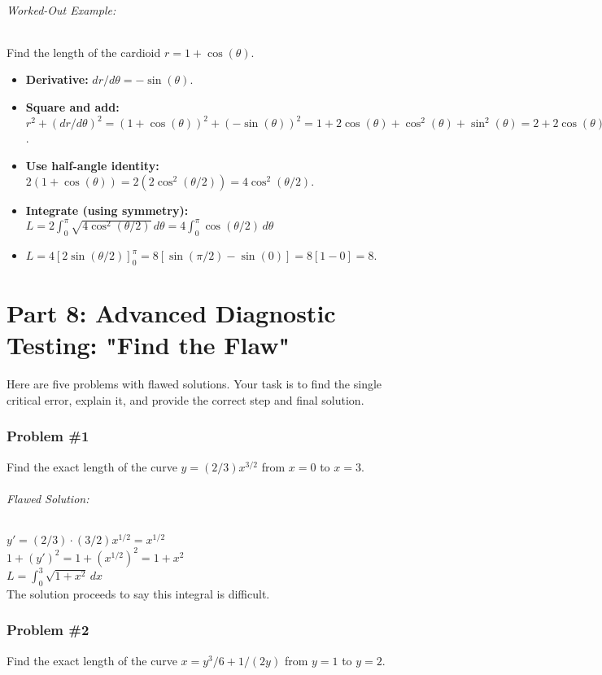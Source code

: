 \documentclass{article}
\begin{document}
\paragraph{Worked-Out Example:} Find the length of the cardioid $r = 1 + \cos(\theta)$.
\begin{itemize}
    \item \textbf{Derivative:} $dr/d\theta = -\sin(\theta)$.
    \item \textbf{Square and add:} $r^2 + (dr/d\theta)^2 = (1 + \cos(\theta))^2 + (-\sin(\theta))^2 = 1 + 2\cos(\theta) + \cos^2(\theta) + \sin^2(\theta) = 2 + 2\cos(\theta)$.
    \item \textbf{Use half-angle identity:} $2(1 + \cos(\theta)) = 2(2\cos^2(\theta/2)) = 4\cos^2(\theta/2)$.
    \item \textbf{Integrate (using symmetry):} $L = 2 \int_{0}^{\pi} \sqrt{4\cos^2(\theta/2)} \,d\theta = 4 \int_{0}^{\pi} \cos(\theta/2) \,d\theta$
    \item $L = 4 [2\sin(\theta/2)]_{0}^{\pi} = 8[\sin(\pi/2) - \sin(0)] = 8[1 - 0] = 8$.
\end{itemize}

\part*{Part 8: Advanced Diagnostic Testing: "Find the Flaw"}
Here are five problems with flawed solutions. Your task is to find the single critical error, explain it, and provide the correct step and final solution.

\section*{Problem \#1}
Find the exact length of the curve $y = (2/3)x^{3/2}$ from $x = 0$ to $x = 3$.
\paragraph{Flawed Solution:}
$y' = (2/3) \cdot (3/2)x^{1/2} = x^{1/2}$ \\
$1 + (y')^2 = 1 + (x^{1/2})^2 = 1 + x^2$ \\
$L = \int_{0}^{3} \sqrt{1 + x^2} \,dx$ \\
The solution proceeds to say this integral is difficult.

\section*{Problem \#2}
Find the exact length of the curve $x = y^3/6 + 1/(2y)$ from $y = 1$ to $y = 2$.
\end{document}

